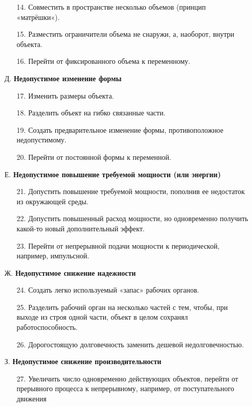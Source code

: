 \documentclass[11pt,a4paper]{article}
\begin{document}
\begin{itemize}
\begin{itemize}
  \item[14.] Совместить в пространстве несколько объемов (принцип «матрёшки«).
  \item[15.] Разместить ограничители объема не снаружи, а, наоборот, внутри
    объекта.
  \item[16.] Перейти от фиксированного объема к переменному.
  \end{itemize}
\item[Д.] \textbf{Недопустимое изменение формы}
  \begin{itemize}
  \item[17.] Изменить размеры объекта.
  \item[18.] Разделить объект на гибко связанные части.
  \item[19.] Создать предварительное изменение формы, противоположное
    недопустимому.
  \item[20.] Перейти от постоянной формы к переменной.
  \end{itemize}
\item[Е.] \textbf{Недопустимое повышение требуемой мощности (или энергии)}
  \begin{itemize}
  \item[21.] Допустить повышение требуемой мощности, пополнив ее недостаток из
    окружающей среды.
  \item[22.] Допустить повышенный расход мощности, но одновременно получить
    какой-то новый дополнительный эффект.
  \item[23.] Перейти от непрерывной подачи мощности к периодической, например,
    импульсной.
  \end{itemize}
\item[Ж.] \textbf{Недопустимое снижение надежности}
  \begin{itemize}
  \item[24.] Создать легко используемый «запас» рабочих органов.
  \item[25.] Разделить рабочий орган на несколько частей с тем, чтобы, при
    выходе из строя одной части, объект в целом сохранял работоспособность.
  \item[26.] Дорогостоящую долговечность заменить дешевой недолговечностью.
  \end{itemize}
\item[З.] \textbf{Недопустимое снижение производительности}
  \begin{itemize}
  \item[27.] Увеличить число одновременно действующих объектов, перейти от
    прерывного процесса к непрерывному, например, от поступательного движения

\end{itemize}
\end{itemize}
\end{document}
